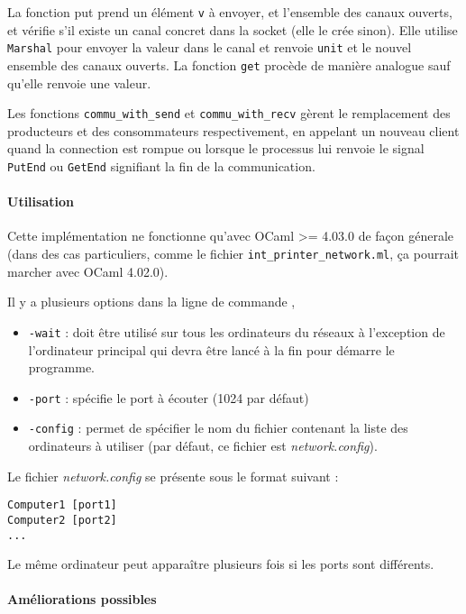 \documentclass[]{scrartcl}
\let\oldparagraph\paragraph
\renewcommand{\paragraph}[1]{\oldparagraph{#1}\mbox{}}
\begin{document}
La fonction put prend un élément \lstinline!v! à envoyer, et l'ensemble
des canaux ouverts, et vérifie s'il existe un canal concret dans la
socket (elle le crée sinon). Elle utilise \lstinline!Marshal! pour
envoyer la valeur dans le canal et renvoie \lstinline!unit! et le nouvel
ensemble des canaux ouverts. La fonction \lstinline!get! procède de
manière analogue sauf qu'elle renvoie une valeur.

Les fonctions \lstinline!commu_with_send! et \lstinline!commu_with_recv!
gèrent le remplacement des producteurs et des consommateurs
respectivement, en appelant un nouveau client quand la connection est
rompue ou lorsque le processus lui renvoie le signal \lstinline!PutEnd!
ou \lstinline!GetEnd! signifiant la fin de la communication.

\paragraph{Utilisation}\label{utilisation}

Cette implémentation ne fonctionne qu'avec OCaml \textgreater{}= 4.03.0
de façon génerale (dans des cas particuliers, comme le fichier
\lstinline!int_printer_network.ml!, ça pourrait marcher avec OCaml
4.02.0).

Il y a plusieurs options dans la ligne de commande ,

\begin{itemize}
\itemsep1pt\parskip0pt
\item
  \lstinline!-wait! : doit être utilisé sur tous les ordinateurs du
  réseaux à l'exception de l'ordinateur principal qui devra être lancé à
  la fin pour démarre le programme.
\item
  \lstinline!-port! : spécifie le port à écouter (1024 par défaut)
\item
  \lstinline!-config! : permet de spécifier le nom du fichier contenant
  la liste des ordinateurs à utiliser (par défaut, ce fichier est
  \emph{network.config}).
\end{itemize}

Le fichier \emph{network.config} se présente sous le format suivant :

\begin{lstlisting}
Computer1 [port1]
Computer2 [port2]
...
\end{lstlisting}

Le même ordinateur peut apparaître plusieurs fois si les ports sont
différents.

\paragraph{Améliorations possibles}\label{amuxe9liorations-possibles}
\end{document}
